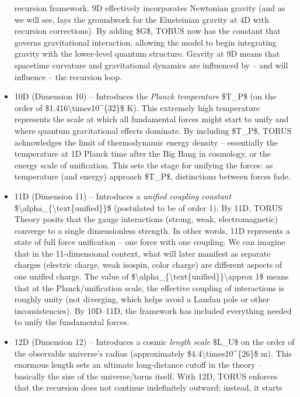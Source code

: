 \documentclass[
]{article}
\begin{document}
\begin{itemize}
  recursion framework. 9D effectively incorporates Newtonian gravity
  (and as we will see, lays the groundwork for the Einsteinian gravity
  at 4D with recursion corrections). By adding \$G\$, TORUS now has the
  constant that governs gravitational interaction, allowing the model to
  begin integrating gravity with the lower-level quantum structure.
  Gravity at 9D means that spacetime curvature and gravitational
  dynamics are influenced by -- and will influence -- the recursion
  loop.
\item
  10D (Dimension 10) -- Introduces the \emph{Planck temperature}
  \$T\_P\$ (on the order of \$1.416\textbackslash times10\^{}\{32\}\$
  K). This extremely high temperature represents the scale at which all
  fundamental forces might start to unify and where quantum
  gravitational effects dominate. By including \$T\_P\$, TORUS
  acknowledges the limit of thermodynamic energy density -- essentially
  the temperature at 1D Planck time after the Big Bang in cosmology, or
  the energy scale of unification. This sets the stage for unifying the
  forces: as temperature (and energy) approach \$T\_P\$, distinctions
  between forces fade.
\item
  11D (Dimension 11) -- Introduces a \emph{unified coupling constant}
  \$\textbackslash alpha\_\{\textbackslash text\{unified\}\}\$
  (postulated to be of order 1). By 11D, TORUS Theory posits that the
  gauge interactions (strong, weak, electromagnetic) converge to a
  single dimensionless strength. In other words, 11D represents a state
  of full force unification -- one force with one coupling. We can
  imagine that in the 11-dimensional context, what will later manifest
  as separate charges (electric charge, weak isospin, color charge) are
  different aspects of one unified charge. The value of
  \$\textbackslash alpha\_\{\textbackslash text\{unified\}\}\textbackslash approx
  1\$ means that at the Planck/uniﬁcation scale, the effective coupling
  of interactions is roughly unity (not diverging, which helps avoid a
  Landau pole or other inconsistencies). By 10D--11D, the framework has
  included everything needed to unify the fundamental forces.
\item
  12D (Dimension 12) -- Introduces a cosmic \emph{length scale} \$L\_U\$
  on the order of the observable universe's radius (approximately
  \$4.4\textbackslash times10\^{}\{26\}\$ m). This enormous length sets
  an ultimate long-distance cutoff in the theory -- basically the size
  of the universe/torus itself. With 12D, TORUS enforces that the
  recursion does not continue indefinitely outward; instead, it starts

\end{itemize}
\end{document}
